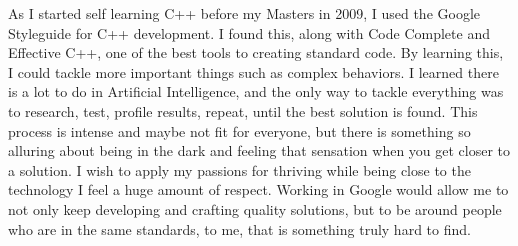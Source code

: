 As I started self learning C++ before my Masters in 2009, I used the Google Styleguide for C++ development. I found this, along with Code Complete and Effective C++, one of the best tools to creating standard code. By learning this, I could tackle more important things such as complex behaviors. I learned there is a lot to do in Artificial Intelligence, and the only way to tackle everything was to research, test, profile results, repeat, until the best solution is found. This process is intense and maybe not fit for everyone, but there is something so alluring about being in the dark and feeling that sensation when you get closer to a solution. I wish to apply my passions for thriving while being close to the technology I feel a huge amount of respect. Working in Google would allow me to not only keep developing and crafting quality solutions, but to be around people who are in the same standards, to me, that is something truly hard to find.  